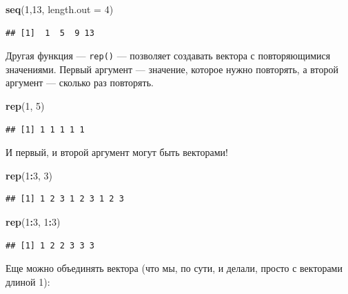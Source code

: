 \documentclass[]{book}
\newenvironment{Shaded}{\begin{snugshade}}{\end{snugshade}}
\newcommand{\DataTypeTok}[1]{\textcolor[rgb]{0.13,0.29,0.53}{#1}}
\newcommand{\DecValTok}[1]{\textcolor[rgb]{0.00,0.00,0.81}{#1}}
\newcommand{\KeywordTok}[1]{\textcolor[rgb]{0.13,0.29,0.53}{\textbf{#1}}}
\newcommand{\NormalTok}[1]{#1}
\newcommand{\OperatorTok}[1]{\textcolor[rgb]{0.81,0.36,0.00}{\textbf{#1}}}
\begin{document}
\begin{Shaded}
\begin{Highlighting}[]
\KeywordTok{seq}\NormalTok{(}\DecValTok{1}\NormalTok{,}\DecValTok{13}\NormalTok{, }\DataTypeTok{length.out =} \DecValTok{4}\NormalTok{)}
\end{Highlighting}
\end{Shaded}

\begin{verbatim}
## [1]  1  5  9 13
\end{verbatim}

Другая функция --- \texttt{rep()} --- позволяет создавать вектора с повторяющимися значениями. Первый аргумент --- значение, которое нужно повторять, а второй аргумент --- сколько раз повторять.

\begin{Shaded}
\begin{Highlighting}[]
\KeywordTok{rep}\NormalTok{(}\DecValTok{1}\NormalTok{, }\DecValTok{5}\NormalTok{)}
\end{Highlighting}
\end{Shaded}

\begin{verbatim}
## [1] 1 1 1 1 1
\end{verbatim}

И первый, и второй аргумент могут быть векторами!

\begin{Shaded}
\begin{Highlighting}[]
\KeywordTok{rep}\NormalTok{(}\DecValTok{1}\OperatorTok{:}\DecValTok{3}\NormalTok{, }\DecValTok{3}\NormalTok{)}
\end{Highlighting}
\end{Shaded}

\begin{verbatim}
## [1] 1 2 3 1 2 3 1 2 3
\end{verbatim}

\begin{Shaded}
\begin{Highlighting}[]
\KeywordTok{rep}\NormalTok{(}\DecValTok{1}\OperatorTok{:}\DecValTok{3}\NormalTok{, }\DecValTok{1}\OperatorTok{:}\DecValTok{3}\NormalTok{)}
\end{Highlighting}
\end{Shaded}

\begin{verbatim}
## [1] 1 2 2 3 3 3
\end{verbatim}

Еще можно объединять вектора (что мы, по сути, и делали, просто с векторами длиной 1):
\end{document}
